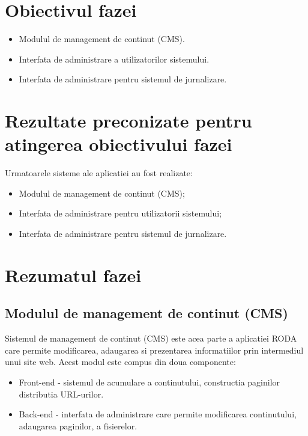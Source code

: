 \documentclass[a4paper, 10pt]{article}
\begin{document}
{\section{Obiectivul fazei}


\begin{itemize}
\item
Modulul de management de continut (CMS).

\item
Interfata de administrare a utilizatorilor sistemului.

\item
Interfata de administrare pentru sistemul de jurnalizare.
\end{itemize}

\section{Rezultate preconizate pentru atingerea obiectivului fazei}

Urmatoarele sisteme ale aplicatiei au fost realizate:
\begin{itemize}
\item
Modulul de management de continut (CMS);
\item
Interfata de administrare pentru utilizatorii sistemului;
\item
Interfata de administrare pentru sistemul de jurnalizare.
\end{itemize}

\section{Rezumatul fazei}

\medskip

\subsection*{Modulul de management de continut (CMS)}


\bigskip

Sistemul de management de continut (CMS) este acea parte a aplicatiei RODA care permite modificarea, adaugarea si prezentarea informatiilor prin intermediul unui site web. Acest modul este compus din doua componente:


\begin{itemize}
\item
Front-end - sistemul de acumulare a continutului, constructia paginilor distributia URL-urilor.
\item
Back-end - interfata de administrare care permite modificarea continutului, adaugarea paginilor, a fisierelor. 
\end{itemize}

}
\end{document}
